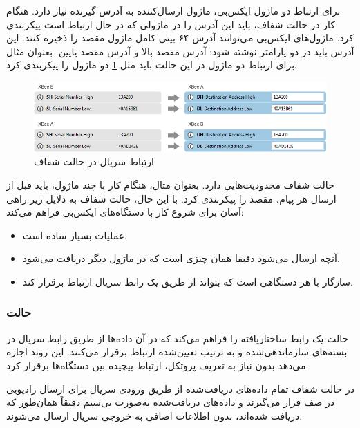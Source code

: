 برای ارتباط دو ماژول ایکس‌بی، ماژول ارسال‌کننده به آدرس گیرنده نیاز دارد. هنگام کار در حالت شفاف، باید این آدرس را در ماژولی که در حال ارتباط است پیکربندی کرد. ماژول‌های ایکس‌بی می‌توانند آدرس ۶۴ بیتی کامل ماژول مقصد را ذخیره کنند\cite{Digi}. این آدرس باید در دو پارامتر نوشته شود: آدرس مقصد بالا و آدرس مقصد پایین. بعنوان مثال برای ارتباط دو ماژول در این حالت باید مثل \cref{fig:transparent_config} \cite{Digi} دو ماژول را پیکربندی کرد.


\begin{figure}[!h]
\centering\includegraphics[scale=.7]{transparent_config.png}
\caption{ارتباط سریال در حالت شفاف \cite{Digi}}\label{fig:transparent_config}
\end{figure}

حالت شفاف محدودیت‌هایی دارد. بعنوان مثال، هنگام کار با چند ماژول، باید قبل از ارسال هر پیام، مقصد را پیکربندی کرد. با این حال، حالت شفاف به دلایل زیر راهی آسان برای شروع کار با دستگاه‌های ایکس‌بی فراهم می‌کند:

\begin{itemize}
\item عملیات بسیار ساده است.
\item آنچه ارسال می‌شود دقیقا همان چیزی است که در ماژول دیگر دریافت می‌شود.
\item سازگار با هر دستگاهی است که بتواند از طریق یک رابط سریال ارتباط برقرار کند.
\end{itemize}

\subsubsection{حالت }

حالت  یک رابط ساختاریافته را فراهم می‌کند که در آن داده‌ها از طریق رابط سریال در بسته‌های سازماندهی‌شده و به ترتیب تعیین‌شده ارتباط برقرار می‌کنند. این روند اجازه می‌دهد بدون نیاز به تعریف پروتکل، ارتباط پیچیده بین دستگاه‌ها برقرار کرد\cite{Digi}.

در حالت شفاف تمام داده‌های دریافت‌شده از طریق ورودی سریال برای ارسال رادیویی در صف قرار می‌گیرند و داده‌های دریافت‌شده به‌صورت بی‌سیم دقیقاً همان‌طور که دریافت شده‌اند، بدون اطلاعات اضافی به خروجی سریال ارسال می‌شوند\cite{Digi}.

